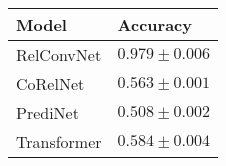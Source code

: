 \begin{tabular}{ll}
\toprule
Model       &  Accuracy \\
\midrule
RelConvNet  &  $0.979 \pm 0.006$ \\
CoRelNet    &  $0.563 \pm 0.001$ \\
PrediNet    &  $0.508 \pm 0.002$ \\
Transformer &  $0.584 \pm 0.004$ \\
\bottomrule
\end{tabular}
